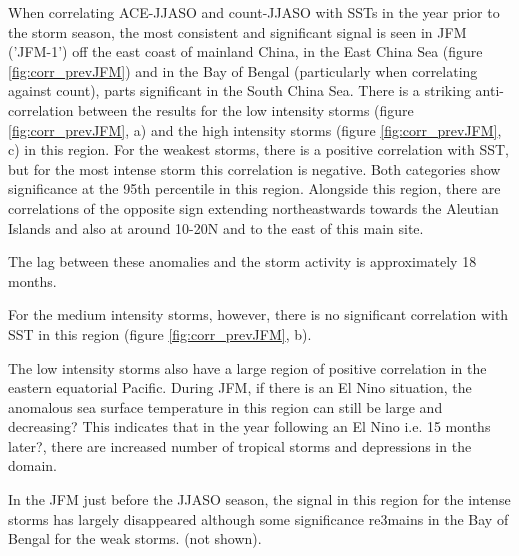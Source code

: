 When correlating ACE-JJASO and count-JJASO with SSTs in the year prior to the storm season, the most consistent and significant signal is seen in JFM ('JFM-1') off the east coast of mainland China, in the East China Sea (figure \ref{fig:corr_prevJFM}) and in the Bay of Bengal (particularly when correlating against count), parts significant in the South China Sea. There is a striking anti-correlation between the results for the low intensity storms (figure \ref{fig:corr_prevJFM}, a) and the high intensity storms (figure \ref{fig:corr_prevJFM}, c) in this region. For the weakest storms, there is a positive correlation with SST, but for the most intense storm this correlation is negative. Both categories show significance at the 95th percentile in this region.  Alongside this region, there are correlations of the opposite sign extending northeastwards towards the Aleutian Islands and also at around 10-20N and to the east of this main site.

The lag between these anomalies and the storm activity is approximately 18 months.

For the medium intensity storms, however, there is no significant correlation with SST in this region (figure \ref{fig:corr_prevJFM}, b). %

The low intensity storms also have a large region of positive correlation in the eastern equatorial Pacific. During JFM, if there is an El Nino situation, the anomalous sea surface temperature in this region can still be large and decreasing? This indicates that in the year following an El Nino i.e. 15 months later?, there are increased number of tropical storms and depressions in the domain.



In the JFM just before the JJASO season, the signal in this region for the intense storms has largely disappeared although some significance re3mains in the Bay of Bengal for the weak storms. (not shown).

